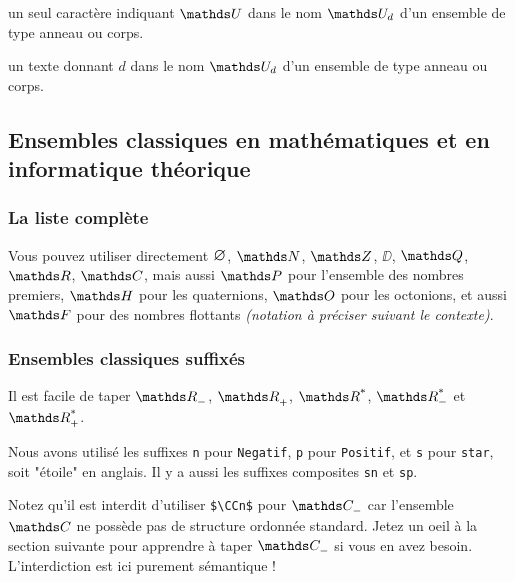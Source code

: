 \documentclass[12pt,a4paper]{article}
\begin{document}
\bigskip



 un seul caractère \ascii{} indiquant $\setalge{U}$ dans le nom $\setalge*{U}{d}$ d'un ensemble de type anneau ou corps.

 un texte donnant $d$ dans le nom $\setalge*{U}{d}$ d'un ensemble de type anneau ou corps.



\subsection{Ensembles classiques en mathématiques et en informatique théorique} 

\subsubsection{La liste complète}

\begin{tcblisting}{}
Vous pouvez utiliser directement $\nullset$, $\NN$, $\ZZ$, $\DD$, $\QQ$, $\RR$, $\CC$,
mais aussi $\PP$ pour l'ensemble des nombres premiers, $\HH$ pour les quaternions,
$\OO$ pour les octonions, et aussi $\FF$ pour des nombres flottants \emph{(notation à 
préciser suivant le contexte)}.
\end{tcblisting}



\subsubsection{Ensembles classiques suffixés}

\begin{tcblisting}{}
Il est facile de taper $\RRn$, $\RRp$, $\RRs$, $\RRsn$ et $\RRsp$.
\end{tcblisting}


Nous avons utilisé les suffixes \verb+n+ pour \verb+Negatif+, \verb+p+ pour \verb+Positif+, et \verb+s+ pour \verb+star+, soit "étoile" en anglais. Il y a aussi les suffixes composites \verb+sn+ et \verb+sp+.

\medskip

Notez qu'il est interdit d'utiliser \verb+$\CCn$+ pour $\setspecial{\CC}{n}$ car l'ensemble $\CC$ ne possède pas de structure ordonnée standard. Jetez un oeil à la section suivante pour apprendre à taper $\setspecial{\CC}{n}$ si vous en avez besoin. L'interdiction est ici purement sémantique !

\medskip
\end{document}
